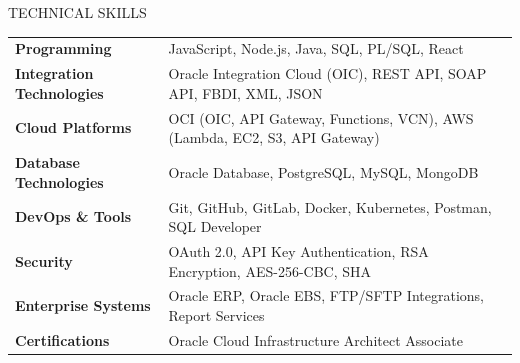 \documentclass{resume}
\begin{document}
\begin{rSection}{TECHNICAL SKILLS}

\begin{tabular}{ @{} >{\bfseries}l @{\hspace{4ex}} l }

Programming & JavaScript, Node.js, Java, SQL, PL/SQL, React \\

Integration Technologies & Oracle Integration Cloud (OIC), REST API, SOAP API, FBDI, XML, JSON \\

Cloud Platforms & OCI (OIC, API Gateway, Functions, VCN), AWS (Lambda, EC2, S3, API Gateway) \\

Database Technologies & Oracle Database, PostgreSQL, MySQL, MongoDB \\

DevOps \& Tools & Git, GitHub, GitLab, Docker, Kubernetes, Postman, SQL Developer \\

Security & OAuth 2.0, API Key Authentication, RSA Encryption, AES-256-CBC, SHA \\

Enterprise Systems & Oracle ERP, Oracle EBS, FTP/SFTP Integrations, Report Services \\

Certifications & Oracle Cloud Infrastructure Architect Associate \\

\end{tabular}

\end{rSection}

\end{document}

